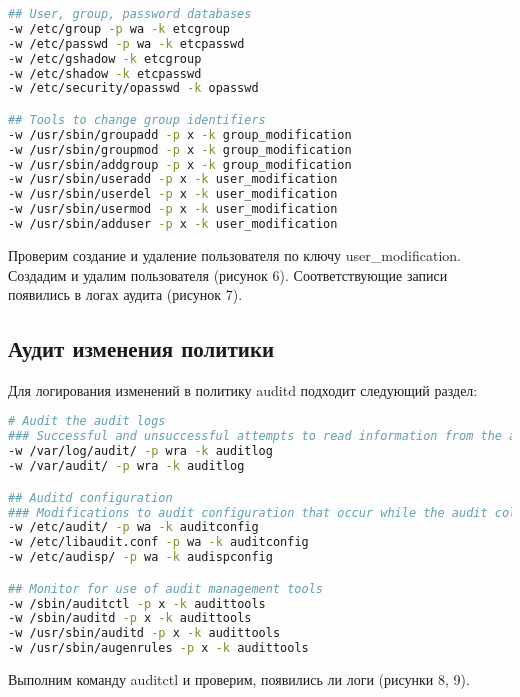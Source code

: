 \begin{lstlisting}[language=bash, numbers=none, caption={Управление учётными записями}]
## User, group, password databases
-w /etc/group -p wa -k etcgroup
-w /etc/passwd -p wa -k etcpasswd
-w /etc/gshadow -k etcgroup
-w /etc/shadow -k etcpasswd
-w /etc/security/opasswd -k opasswd

## Tools to change group identifiers
-w /usr/sbin/groupadd -p x -k group_modification
-w /usr/sbin/groupmod -p x -k group_modification
-w /usr/sbin/addgroup -p x -k group_modification
-w /usr/sbin/useradd -p x -k user_modification
-w /usr/sbin/userdel -p x -k user_modification
-w /usr/sbin/usermod -p x -k user_modification
-w /usr/sbin/adduser -p x -k user_modification
\end{lstlisting}

Проверим создание и удаление пользователя по ключу user\_modification. Создадим и удалим пользователя (рисунок 6). Соответствующие записи появились в логах аудита (рисунок 7).

\FloatBarrier

\FloatBarrier


\subsection{Аудит изменения политики}
Для логирования изменений в политику auditd подходит следующий раздел:

\begin{lstlisting}[language=bash, numbers=none, caption={Аудит изменения политики}]
# Audit the audit logs
### Successful and unsuccessful attempts to read information from the audit records
-w /var/log/audit/ -p wra -k auditlog
-w /var/audit/ -p wra -k auditlog

## Auditd configuration
### Modifications to audit configuration that occur while the audit collection functions are operating
-w /etc/audit/ -p wa -k auditconfig
-w /etc/libaudit.conf -p wa -k auditconfig
-w /etc/audisp/ -p wa -k audispconfig

## Monitor for use of audit management tools
-w /sbin/auditctl -p x -k audittools
-w /sbin/auditd -p x -k audittools
-w /usr/sbin/auditd -p x -k audittools
-w /usr/sbin/augenrules -p x -k audittools

\end{lstlisting}

Выполним команду auditctl и проверим, появились ли логи (рисунки 8, 9). 

